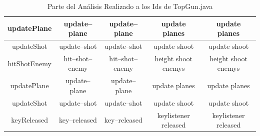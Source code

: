 \begin{table}
\begin{tabular}{| c | c | c | c | c |}
updatePlane&update--plane&update--plane&update planes&update planes\\ \hline
updateShot&update--shot&update--shot&update shoot&update shoot\\ \hline
hitShotEnemy&hit--shot--enemy&hit--shot--enemy&height shoot enemys&height shoot enemys\\ \hline
updatePlane&update--plane&update--plane&update planes&update planes\\ \hline
updateShot&update--shot&update--shot&update shoot&update shoot\\ \hline
keyReleased&key--released&key--released&keylistener released&keylistener released\\ \hline
   
   	\end{tabular}  
	 
   \caption{Parte del Análisis Realizado a los Ids de TopGun.java}
   \label{tabla7}
     
\end{table} 

\clearpage %